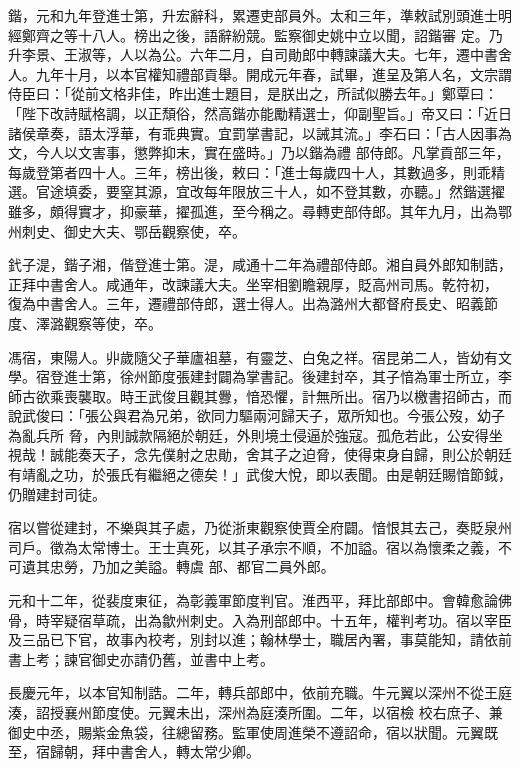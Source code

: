 \begin{pinyinscope}
 鍇，元和九年登進士第，升宏辭科，累遷吏部員外。太和三年，準敕試別頭進士明經鄭齊之等十八人。榜出之後，語辭紛競。監察御史姚中立以聞，詔鍇審
 定。乃升李景、王淑等，人以為公。六年二月，自司勛郎中轉諫議大夫。七年，遷中書舍人。九年十月，以本官權知禮部貢舉。開成元年春，試畢，進呈及第人名，文宗謂侍臣曰：「從前文格非佳，昨出進士題目，是朕出之，所試似勝去年。」鄭覃曰：「陛下改詩賦格調，以正頹俗，然高鍇亦能勵精選士，仰副聖旨。」帝又曰：「近日諸侯章奏，語太浮華，有乖典實。宜罰掌書記，以誡其流。」李石曰：「古人因事為文，今人以文害事，懲弊抑末，實在盛時。」乃以鍇為禮
 部侍郎。凡掌貢部三年，每歲登第者四十人。三年，榜出後，敕曰：「進士每歲四十人，其數過多，則乖精選。官途填委，要窒其源，宜改每年限放三十人，如不登其數，亦聽。」然鍇選擢雖多，頗得實才，抑豪華，擢孤進，至今稱之。尋轉吏部侍郎。其年九月，出為鄂州刺史、御史大夫、鄂岳觀察使，卒。



 釴子湜，鍇子湘，偕登進士第。湜，咸通十二年為禮部侍郎。湘自員外郎知制誥，正拜中書舍人。咸通年，改諫議大夫。坐宰相劉瞻親厚，貶高州司馬。乾符初，
 復為中書舍人。三年，遷禮部侍郎，選士得人。出為潞州大都督府長史、昭義節度、澤潞觀察等使，卒。



 馮宿，東陽人。丱歲隨父子華廬祖墓，有靈芝、白兔之祥。宿昆弟二人，皆幼有文學。宿登進士第，徐州節度張建封闢為掌書記。後建封卒，其子愔為軍士所立，李師古欲乘喪襲取。時王武俊且觀其釁，愔恐懼，計無所出。宿乃以檄書招師古，而說武俊曰：「張公與君為兄弟，欲同力驅兩河歸天子，眾所知也。今張公歿，幼子為亂兵所
 脅，內則誠款隔絕於朝廷，外則境土侵逼於強寇。孤危若此，公安得坐視哉！誠能奏天子，念先僕射之忠勛，舍其子之迫脅，使得束身自歸，則公於朝廷有靖亂之功，於張氏有繼絕之德矣！」武俊大悅，即以表聞。由是朝廷賜愔節鉞，仍贈建封司徒。



 宿以嘗從建封，不樂與其子處，乃從浙東觀察使賈全府闢。愔恨其去己，奏貶泉州司戶。徵為太常博士。王士真死，以其子承宗不順，不加謚。宿以為懷柔之義，不可遺其忠勞，乃加之美謚。轉虞
 部、都官二員外郎。



 元和十二年，從裴度東征，為彰義軍節度判官。淮西平，拜比部郎中。會韓愈論佛骨，時宰疑宿草疏，出為歙州刺史。入為刑部郎中。十五年，權判考功。宿以宰臣及三品已下官，故事內校考，別封以進；翰林學士，職居內署，事莫能知，請依前書上考；諫官御史亦請仍舊，並書中上考。



 長慶元年，以本官知制誥。二年，轉兵部郎中，依前充職。牛元翼以深州不從王庭湊，詔授襄州節度使。元翼未出，深州為庭湊所圍。二年，以宿檢
 校右庶子、兼御史中丞，賜紫金魚袋，往總留務。監軍使周進榮不遵詔命，宿以狀聞。元翼既至，宿歸朝，拜中書舍人，轉太常少卿。




\end{pinyinscope}
